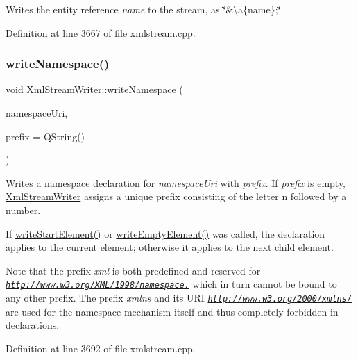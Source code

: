 Writes the entity reference {\itshape name} to the stream, as \char`\"{}\&\textbackslash{}a\{name\};\char`\"{}. 

Definition at line 3667 of file xmlstream.\+cpp.

\mbox{\label{class_xml_stream_writer_ae04b7c7035435fd98cc625257776e732}} 
\subsubsection{\texorpdfstring{write\+Namespace()}{writeNamespace()}}
{\footnotesize\ttfamily void Xml\+Stream\+Writer\+::write\+Namespace (\begin{DoxyParamCaption}\item[{const Q\+String \&}]{namespace\+Uri,  }\item[{const Q\+String \&}]{prefix = {\ttfamily QString()} }\end{DoxyParamCaption})}

Writes a namespace declaration for {\itshape namespace\+Uri} with {\itshape prefix}. If {\itshape prefix} is empty, \hyperlink{class_xml_stream_writer}{Xml\+Stream\+Writer} assigns a unique prefix consisting of the letter \textquotesingle{}n\textquotesingle{} followed by a number.

If \hyperlink{class_xml_stream_writer_aa001c660c1df012b4e37773aa219c379}{write\+Start\+Element()} or \hyperlink{class_xml_stream_writer_a07e058f896327e9236e7c19132842cf2}{write\+Empty\+Element()} was called, the declaration applies to the current element; otherwise it applies to the next child element.

Note that the prefix {\itshape xml} is both predefined and reserved for {\itshape \href{http://www.w3.org/XML/1998/namespace,}{\tt http\+://www.\+w3.\+org/\+X\+M\+L/1998/namespace,}} which in turn cannot be bound to any other prefix. The prefix {\itshape xmlns} and its U\+RI {\itshape \href{http://www.w3.org/2000/xmlns/}{\tt http\+://www.\+w3.\+org/2000/xmlns/}} are used for the namespace mechanism itself and thus completely forbidden in declarations. 

Definition at line 3692 of file xmlstream.\+cpp.

\mbox{\label{class_xml_stream_writer_a5b31ab7e5667538264c8d8fa8de79eda}} 
